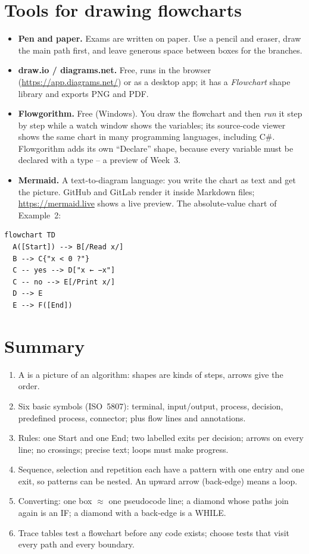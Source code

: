\documentclass[11pt,a4paper]{article}
\begin{document}
\section{Tools for drawing flowcharts}\label{sec:tools}
\begin{itemize}[leftmargin=*,itemsep=2pt]
  \item \textbf{Pen and paper.} Exams are written on paper. Use a pencil and eraser, draw the main path first, and leave generous space between boxes for the branches.
  \item \textbf{draw.io / diagrams.net.} Free, runs in the browser (\url{https://app.diagrams.net/}) or as a desktop app; it has a \emph{Flowchart} shape library and exports PNG and PDF.
  \item \textbf{Flowgorithm.} Free (Windows). You draw the flowchart and then \emph{run} it step by step while a watch window shows the variables; its source-code viewer shows the same chart in many programming languages, including C\#. Flowgorithm adds its own ``Declare'' shape, because every variable must be declared with a type -- a preview of Week~3.
  \item \textbf{Mermaid.} A text-to-diagram language: you write the chart as text and get the picture. GitHub and GitLab render it inside Markdown files; \url{https://mermaid.live} shows a live preview. The absolute-value chart of Example~2:
\end{itemize}
\begin{lstlisting}[language={},numbers=none]
flowchart TD
  A([Start]) --> B[/Read x/]
  B --> C{"x < 0 ?"}
  C -- yes --> D["x ← −x"]
  C -- no --> E[/Print x/]
  D --> E
  E --> F([End])
\end{lstlisting}

\section{Summary}\label{sec:summary}
\begin{enumerate}[leftmargin=*,itemsep=1pt]
  \item A  is a picture of an algorithm: shapes are kinds of steps, arrows give the order.
  \item Six basic symbols (ISO~5807): terminal, input/output, process, decision, predefined process, connector; plus flow lines and annotations.
  \item Rules: one Start and one End; two labelled exits per decision; arrows on every line; no crossings; precise text; loops must make progress.
  \item Sequence, selection and repetition each have a pattern with one entry and one exit, so patterns can be nested. An upward arrow (back-edge) means a loop.
  \item Converting: one box $\approx$ one pseudocode line; a diamond whose paths join again is an IF; a diamond with a back-edge is a WHILE.
  \item Trace tables test a flowchart before any code exists; choose tests that visit every path and every boundary.
\end{enumerate}
\end{document}
